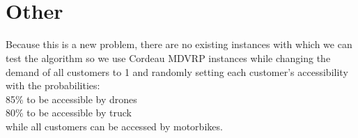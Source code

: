 \documentclass{article}
\begin{document}
	\
	
	\
	\
	\
	\
	\
	\
	\
	\
	\
	\
	\newpage
	
	\section{Other}

	Because this is a new problem, there are no existing instances with which we can test the algorithm so we use Cordeau MDVRP instances while changing the demand of all customers to 1 and randomly setting each customer's accessibility with the probabilities:\\
	85\% to be accessible by drones\\
	80\% to be accessible by truck\\
	while all customers can be accessed by motorbikes.\\
\end{document}
